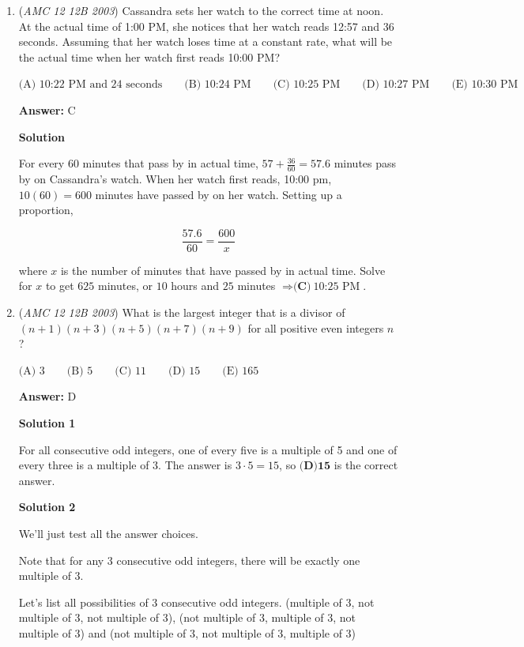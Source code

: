 \begin{enumerate}
	\item (\textit{AMC 12 12B 2003}) Cassandra sets her watch to the correct time at noon. At the actual time of 1:00 PM, she notices that her watch reads 12:57 and 36 seconds. Assuming that her watch loses time at a constant rate, what will be the actual time when her
watch first reads 10:00 PM?


 $\text {(A) 10:22 PM and 24 seconds}  \qquad \text {(B) 10:24 PM} \qquad \text {(C) 10:25 PM}  \qquad \text {(D) 10:27 PM}  \qquad \text {(E) 10:30 PM}$

 \textbf{Answer: }C



\textbf{Solution}

For every $60$ minutes that pass by in actual time, $57+\frac{36}{60}=57.6$ minutes pass by on Cassandra's watch. When her watch first reads, 10:00 pm, $10(60)=600$ minutes have passed by on her watch. Setting up a proportion,

 
 \[\frac{57.6}{60}=\frac{600}{x}\]

 where $x$ is the number of minutes that have passed by in actual time. Solve for $x$ to get $625$ minutes, or $10$ hours and $25$ minutes $\Rightarrow \boxed{\textbf{(C)}\ \text{10:25 PM}}$.

 


	\item (\textit{AMC 12 12B 2003}) What is the largest integer that is a divisor of $(n+1)(n+3)(n+5)(n+7)(n+9)$ for all positive even integers $n$?


 $\text {(A) } 3 \qquad \text {(B) } 5 \qquad \text {(C) } 11 \qquad \text {(D) } 15 \qquad \text {(E) } 165$

 \textbf{Answer: }D



\textbf{Solution 1}

For all consecutive odd integers, one of every five is a multiple of 5 and one of every three is a multiple of 3. The answer is $3 \cdot 5 = 15$, so  ${\boxed{\textbf{(D)15}}}$ is the correct answer.

 



\textbf{Solution 2}

We'll just test all the answer choices.

 Note that for any 3 consecutive odd integers, there will be exactly one multiple of $3.$

 Let's list all possibilities of 3 consecutive odd integers. (multiple of 3, not multiple of 3, not multiple of 3), (not multiple of 3, multiple of 3, not multiple of 3) and (not multiple of 3, not multiple of 3, multiple of 3)


\end{enumerate}

